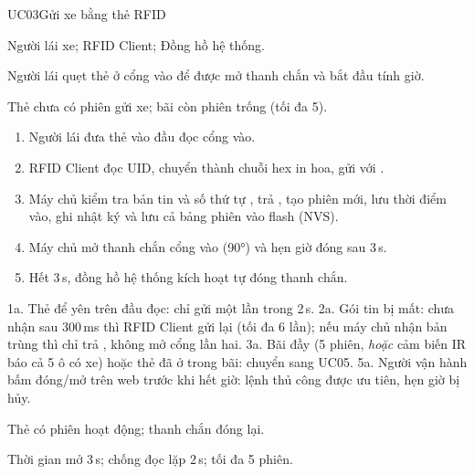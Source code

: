 \begin{usecase}{UC03}{Gửi xe bằng thẻ RFID}
\item[Tác nhân] Người lái xe; RFID Client; Đồng hồ hệ thống.
\item[Mô tả] Người lái quẹt thẻ ở cổng vào để được mở thanh chắn và bắt đầu tính giờ.
\item[Tiền điều kiện] Thẻ chưa có phiên gửi xe; bãi còn phiên trống (tối đa 5).
\item[Luồng chính] \begin{enumerate}[nosep,leftmargin=1.3em]
  \item Người lái đưa thẻ vào đầu đọc cổng vào.
  \item RFID Client đọc UID, chuyển thành chuỗi hex in hoa, gửi  với .
  \item Máy chủ kiểm tra bản tin và số thứ tự , trả , tạo phiên mới, lưu thời điểm vào,
        ghi nhật ký  và lưu cả bảng phiên vào flash (NVS).
  \item Máy chủ mở thanh chắn cổng vào (90°) và hẹn giờ đóng sau 3\,s.
  \item Hết 3\,s, đồng hồ hệ thống kích hoạt tự đóng thanh chắn.
\end{enumerate}
\item[Ngoại lệ] 1a. Thẻ để yên trên đầu đọc: chỉ gửi một lần trong 2\,s.
  2a. Gói tin bị mất: chưa nhận  sau 300\,ms thì RFID Client gửi lại (tối đa 6 lần);
      nếu máy chủ nhận bản trùng thì chỉ trả , không mở cổng lần hai.
  3a. Bãi đầy (5 phiên, \emph{hoặc} cảm biến IR báo cả 5 ô có xe) hoặc thẻ đã ở trong bãi: chuyển sang UC05.
  5a. Người vận hành bấm đóng/mở trên web trước khi hết giờ: lệnh thủ công được ưu tiên, hẹn giờ bị hủy.
\item[Hậu điều kiện] Thẻ có phiên hoạt động; thanh chắn đóng lại.
\item[Thông số] Thời gian mở 3\,s; chống đọc lặp 2\,s; tối đa 5 phiên.
\end{usecase}

